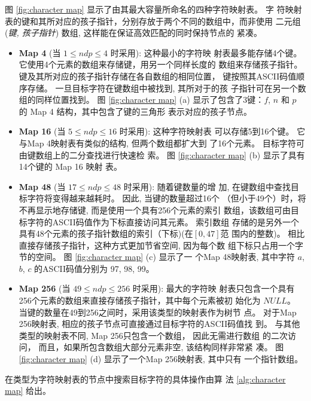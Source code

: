图 \ref{fig:character map} 显示了由其最大容量所命名的四种字符映射表。 字
符映射表的键和其所对应的孩子指针，分别存放于两个不同的数组中，而非使用
二元组 (\emph{键, 孩子指针}) 数组, 这样能在保证高效匹配的同时保持节点的
紧凑。

\begin{itemize}
\item \textbf{Map 4} (当 $1 \leq ndp \leq 4$ 时采用): 这种最小的字符映
  射表最多能存储4个键。 它使用4个元素的数组来存储键，用另一个同样长度的
  数组来存储孩子指针。 键及其所对应的孩子指针存储在各自数组的相同位置，
  键按照其ASCII码值顺序存储。 一旦目标字符在键数组中被找到, 其所对于的孩
  子指针可在另一个数组的同样位置找到。  图 \ref{fig:character map} (a)
  显示了包含了3键：$f$, $n$ 和 $p$ 的 Map 4 结构，其中包含了键的三角形
  表示对应的孩子节点。

\item \textbf{Map 16} (当 $5 \leq ndp \leq 16$ 时采用): 这种字符映射表
  可以存储5到16个键。 它与Map 4映射表有类似的结构, 但两个数组都扩大到
  了16个元素。 目标字符可由键数组上的二分查找进行快速检
  索。 图 \ref{fig:character map} (b) 显示了具有14个键的 Map 16 映射
  表。


\item \textbf{Map 48} (当 $17 \leq ndp \leq 48$ 时采用): 随着键数量的增
  加, 在键数组中查找目标字符将变得越来越耗时。 因此, 当键的数量超过16个
  （但小于49个）时，将不再显示地存储键, 而是使用一个具有256个元素的索引
  数组，该数组可由目标字符的ASCII码值作为下标直接访问其元素。 索引数组
  存储的是另外一个具有48个元素的孩子指针数组的索引（下标)(在$[0,47]$范
  围内的整数)。 相比直接存储孩子指针，这种方式更加节省空间, 因为每个数
  组下标只占用一个字节的空间。 图 \ref{fig:character map} (c) 显示了一
  个Map 48映射表, 其中字符 $a$, $b$, $c$ 的ASCII码值分别为 97, 98, 99。

\item \textbf{Map 256} (当 $49 \leq ndp \leq 256$ 时采用): 最大的字符映
  射表只包含一个具有256个元素的数组来直接存储孩子指针，其中每个元素被初
  始化为 $NULL$。 当键的数量在49到256之间时，采用该类型的映射表作为树节
  点。 对于Map 256映射表, 相应的孩子节点可直接通过目标字符的ASCII码值找
  到。 与其他类型的映射表不同, Map 256只包含一个数组， 因此无需进行数组
  的二次访问， 而且，如果所包含数组大部分元素非空, 该结构同样非常紧
  凑。 图 \ref{fig:character map} (d) 显示了一个Map 256映射表, 其中只有
  一个指针数组。
\end{itemize}

在类型为字符映射表的节点中搜索目标字符的具体操作由算
法 \ref{alg:character map} 给出。\\

